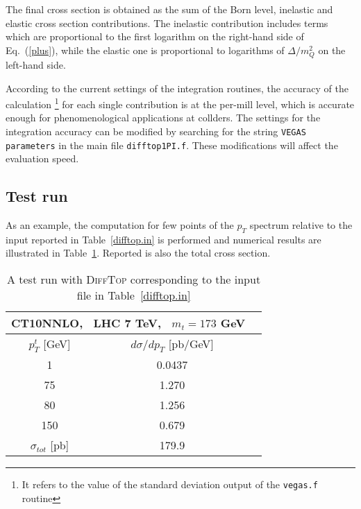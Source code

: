 \documentclass[11pt]{article}
\begin{document}
{The final cross section is obtained as the sum of the Born level, 
inelastic and elastic cross section contributions. 
The inelastic contribution includes terms which are proportional 
to the first logarithm on the right-hand side of Eq.~(\ref{plus}), while the 
elastic one is proportional to logarithms of $\Delta/m_Q^2$ on the left-hand side.

According to the current settings of the integration routines, 
the accuracy of the calculation
\footnote{It refers to the value of the standard deviation output of the \texttt{vegas.f} routine}
for each single contribution is at the per-mill level, 
which is accurate enough for phenomenological applications at collders. 
The settings for the integration accuracy can be modified by searching for the string 
\texttt{VEGAS parameters} in the main file \texttt{difftop1PI.f}.
These modifications will affect the evaluation speed.








\subsection{Test run}\label{sec:Test run}

As an example, the computation for few points of the $p_T$ spectrum 
relative to the input reported in Table~\ref{difftop.in} 
is performed and numerical results are illustrated in Table~\ref{test-run}.
Reported is also the total cross section.

\begin{table}[h]
\begin{centering}
\begin{scriptsize}
\begin{tabular}{|c|c|c|}
\hline 
\multicolumn{2}{|c|}{CT10NNLO,~ LHC 7 TeV,~ $m_t=173$ GeV} \tabularnewline
\hline 
\hline 
$p_T^{t}$ [GeV] & $d\sigma/dp_T$ [pb/GeV] \tabularnewline
\hline 
1  & 0.0437   \tabularnewline
\hline
75  & 1.270   \tabularnewline
\hline 
80  & 1.256   \tabularnewline
\hline 
150  & 0.679   \tabularnewline
\hline 
$\sigma_{tot}$ [pb] & 179.9 \tabularnewline
\hline 
\end{tabular}
\end{scriptsize}
\par
\end{centering}
\caption{A test run with \textsc{DiffTop} corresponding to the input file in Table~\ref{difftop.in} }
\label{test-run}
\end{table}












}
\end{document}
